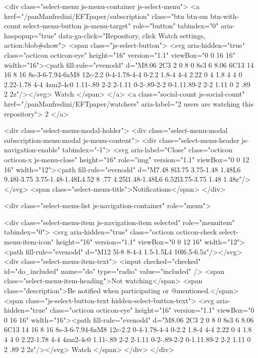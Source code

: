         <div class="select-menu js-menu-container js-select-menu">
          <a href="/panManfredini/EFTpaper/subscription"
            class="btn btn-sm btn-with-count select-menu-button js-menu-target" role="button" tabindex="0" aria-haspopup="true"
            data-ga-click="Repository, click Watch settings, action:blob#show">
            <span class="js-select-button">
              <svg aria-hidden="true" class="octicon octicon-eye" height="16" version="1.1" viewBox="0 0 16 16" width="16"><path fill-rule="evenodd" d="M8.06 2C3 2 0 8 0 8s3 6 8.06 6C13 14 16 8 16 8s-3-6-7.94-6zM8 12c-2.2 0-4-1.78-4-4 0-2.2 1.8-4 4-4 2.22 0 4 1.8 4 4 0 2.22-1.78 4-4 4zm2-4c0 1.11-.89 2-2 2-1.11 0-2-.89-2-2 0-1.11.89-2 2-2 1.11 0 2 .89 2 2z"/></svg>
              Watch
            </span>
          </a>
          <a class="social-count js-social-count"
            href="/panManfredini/EFTpaper/watchers"
            aria-label="2 users are watching this repository">
            2
          </a>

        <div class="select-menu-modal-holder">
          <div class="select-menu-modal subscription-menu-modal js-menu-content">
            <div class="select-menu-header js-navigation-enable" tabindex="-1">
              <svg aria-label="Close" class="octicon octicon-x js-menu-close" height="16" role="img" version="1.1" viewBox="0 0 12 16" width="12"><path fill-rule="evenodd" d="M7.48 8l3.75 3.75-1.48 1.48L6 9.48l-3.75 3.75-1.48-1.48L4.52 8 .77 4.25l1.48-1.48L6 6.52l3.75-3.75 1.48 1.48z"/></svg>
              <span class="select-menu-title">Notifications</span>
            </div>

              <div class="select-menu-list js-navigation-container" role="menu">

                <div class="select-menu-item js-navigation-item selected" role="menuitem" tabindex="0">
                  <svg aria-hidden="true" class="octicon octicon-check select-menu-item-icon" height="16" version="1.1" viewBox="0 0 12 16" width="12"><path fill-rule="evenodd" d="M12 5l-8 8-4-4 1.5-1.5L4 10l6.5-6.5z"/></svg>
                  <div class="select-menu-item-text">
                    <input checked="checked" id="do_included" name="do" type="radio" value="included" />
                    <span class="select-menu-item-heading">Not watching</span>
                    <span class="description">Be notified when participating or @mentioned.</span>
                    <span class="js-select-button-text hidden-select-button-text">
                      <svg aria-hidden="true" class="octicon octicon-eye" height="16" version="1.1" viewBox="0 0 16 16" width="16"><path fill-rule="evenodd" d="M8.06 2C3 2 0 8 0 8s3 6 8.06 6C13 14 16 8 16 8s-3-6-7.94-6zM8 12c-2.2 0-4-1.78-4-4 0-2.2 1.8-4 4-4 2.22 0 4 1.8 4 4 0 2.22-1.78 4-4 4zm2-4c0 1.11-.89 2-2 2-1.11 0-2-.89-2-2 0-1.11.89-2 2-2 1.11 0 2 .89 2 2z"/></svg>
                      Watch
                    </span>
                  </div>
                </div>

